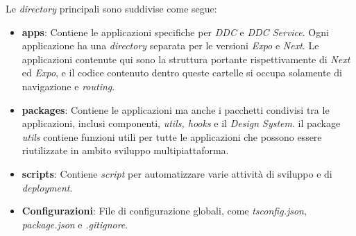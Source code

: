 Le \textit{directory} principali sono suddivise come segue:
\begin{itemize}
    \item \textbf{apps}: Contiene le applicazioni specifiche per \textit{DDC} e \textit{DDC Service}. 
    Ogni applicazione ha una \textit{directory} separata per le versioni \textit{Expo} e \textit{Next}.
    Le applicazioni contenute qui sono la struttura portante rispettivamente di \textit{Next} ed \textit{Expo}, e il codice contenuto dentro queste cartelle si occupa solamente di navigazione e \textit{routing}.
    \item \textbf{packages}: Contiene le applicazioni ma anche i pacchetti condivisi tra le applicazioni, inclusi componenti, \textit{utils, hooks} e il \textit{Design System}.
    il package \textit{utils} contiene funzioni utili per tutte le applicazioni che possono essere riutilizzate in ambito sviluppo multipiattaforma.
    \item \textbf{scripts}: Contiene \textit{script} per automatizzare varie attività di sviluppo e di \textit{deployment}.
    \item \textbf{Configurazioni}: File di configurazione globali, come \textit{tsconfig.json}, \textit{package.json} e \textit{.gitignore}.
\end{itemize}

